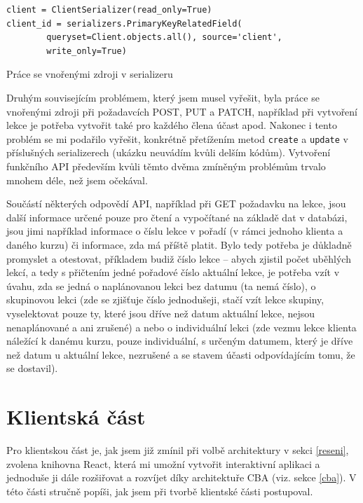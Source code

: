     \begin{listing}[ht]
    	\begin{verbatim}
client = ClientSerializer(read_only=True)
client_id = serializers.PrimaryKeyRelatedField(
        queryset=Client.objects.all(), source='client',
        write_only=True)
    	\end{verbatim}
    	\caption{Práce se vnořenými zdroji v serializeru}\label{lst:apiserializer2}
    \end{listing}
    
    Druhým souvisejícím problémem, který jsem musel vyřešit, byla práce se vnořenými zdroji při požadavcích POST, PUT a PATCH, například při vytvoření lekce je potřeba vytvořit také pro každého člena účast apod. Nakonec i tento problém se mi podařilo vyřešit, konkrétně přetížením metod \verb|create| a \verb|update| v příslušných serializerech (ukázku neuvádím kvůli delším kódům). Vytvoření funkčního API především kvůli těmto dvěma zmíněným problémům trvalo mnohem déle, než jsem očekával.
    
    Součástí některých odpovědí API, například při GET požadavku na lekce, jsou další informace určené pouze pro čtení a vypočítané na základě dat v databázi, jsou jimi například informace o číslu lekce v pořadí (v rámci jednoho klienta a daného kurzu) či informace, zda má příště platit. Bylo tedy potřeba je důkladně promyslet a otestovat, příkladem budiž číslo lekce -- abych zjistil počet uběhlých lekcí, a tedy s přičtením jedné pořadové číslo aktuální lekce, je potřeba vzít v úvahu, zda se jedná o naplánovanou lekci bez datumu (ta nemá číslo), o skupinovou lekci (zde se zjišťuje číslo jednodušeji, stačí vzít lekce skupiny, vyselektovat pouze ty, které jsou dříve než datum aktuální lekce, nejsou nenaplánované a ani zrušené) a nebo o individuální lekci (zde vezmu lekce klienta náležící k danému kurzu, pouze individuální, s určeným datumem, který je dříve než datum u aktuální lekce, nezrušené a se stavem účasti odpovídajícím tomu, že se dostavil).
    
    \section{Klientská část}
    Pro klientskou část je, jak jsem již zmínil při volbě architektury v sekci \ref{reseni}, zvolena knihovna React, která mi umožní vytvořit interaktivní aplikaci a jednoduše ji dále rozšiřovat a rozvíjet díky architektuře CBA (viz. sekce \ref{cba}). V této části stručně popíši, jak jsem při tvorbě klientské části postupoval.
    
